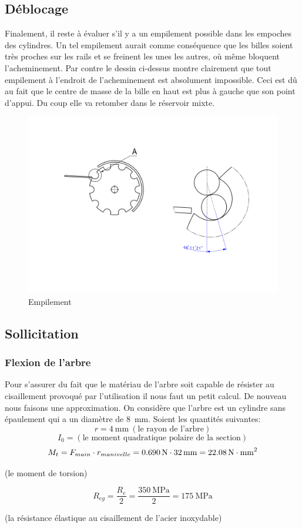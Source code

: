 \subsection{Déblocage}
Finalement, il reste à évaluer s'il y a un empilement possible dans les empoches des cylindres. Un tel empilement aurait comme conséquence que les billes soient très proches sur les rails et se freinent les unes les autres, où même bloquent l'acheminement. Par contre le dessin ci-dessus montre clairement que tout empilement à l'endroit de l'acheminement est absolument impossible. Ceci est dû au fait que le centre de masse de la bille en haut est plus à gauche que son point d'appui. Du coup elle va retomber dans le réservoir mixte.
\begin{figure}
    \centering
    \includegraphics[width=\textwidth]{Graphics/Dessins_justification_Leon/DESSIN_EMPILEMENT.pdf}
    \caption{Empilement}
\end{figure}
\subsection{Sollicitation}
\subsubsection{Flexion de l'arbre}
Pour s'assurer du fait que le matériau de l'arbre soit capable de résister au cisaillement provoqué par l'utilisation il nous faut un petit calcul. De nouveau nous faisons une approximation. On considère que l'arbre est un cylindre sans épaulement qui a un diamètre de \SI{8}{\milli\metre}.
Soient les quantités suivantes:\\
\[r = \SI{4}{\milli\metre} \ (\text{le rayon de l'arbre})\]
\[I_{0} =  (\text{le moment quadratique polaire de la section}) \]
\[M_{t} =  \mit F_{main}\mit \cdot r_{manivelle} = \SI{0.690}{\N}\cdot\SI{32}{\milli\metre} = \SI{22.08}{\N\cdot mm^2} \]
\begin{center}
(le moment de torsion)
\end{center}
\[R_{eg} = \frac{R_{e}}{2} = \frac{\SI{350}{\mega\pascal}}{2} = \SI{175}{\mega\pascal}\]
\begin{center}
(la résistance élastique au cisaillement de l'acier inoxydable)   
\end{center}

